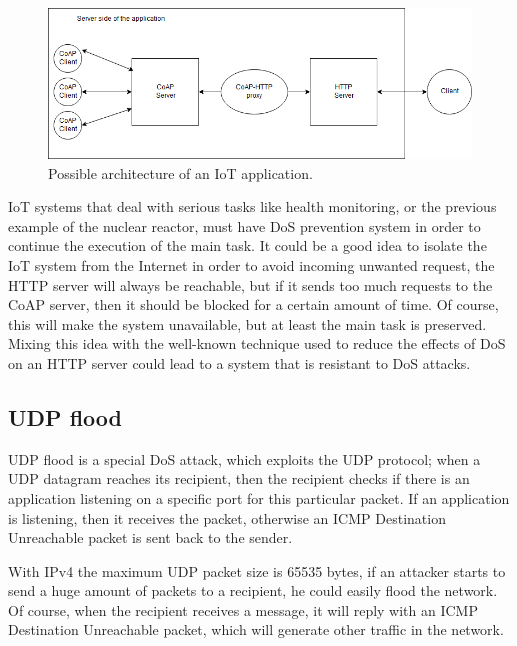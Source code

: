 	\begin{figure}
		\includegraphics[width=\linewidth]{coap-vuln-img2.png}
		\caption{Possible architecture of an IoT application.}
		\label{fig:coap-vuln2}
	\end{figure}
	
	IoT systems that deal with serious tasks like health monitoring, or the previous example of the nuclear reactor, must have DoS prevention system in order to continue the execution of the main task.\newline
	It could be a good idea to isolate the IoT system from the Internet in order to avoid incoming unwanted request, the HTTP server will always be reachable, but if it sends too much requests to the CoAP server, then it should be blocked for a certain amount of time. Of course, this will make the system unavailable, but at least the main task is preserved.\newline
	Mixing this idea with the well-known technique used to reduce the effects of DoS on an HTTP server could lead to a system that is resistant to DoS attacks.\newline
	
	\subsection{UDP flood}
	UDP flood is a special DoS attack, which exploits the UDP protocol; when a UDP datagram reaches its recipient, then the recipient checks if there is an application listening on a specific port for this particular packet.\newline
	If an application is listening, then it receives the packet, otherwise an ICMP Destination Unreachable packet is sent back to the sender.\newline
	
	With IPv4 the maximum UDP packet size is 65535 bytes, if an attacker starts to send a huge amount of packets to a recipient, he could easily flood the network.\newline
	Of course, when the recipient receives a message, it will reply with an ICMP Destination Unreachable packet, which will generate other traffic in the network.\newline


